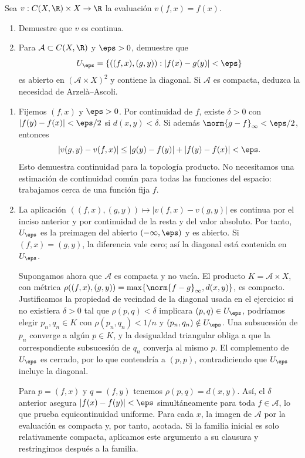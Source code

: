 \begin{ejercicio}\label{ej:lectura-27-2}
Sea $v:C(X,\R)\times X\to\R$ la evaluación $v(f,x)=f(x)$.
\begin{enumerate}[label=(\roman*)]
\item Demuestre que $v$ es continua.
\item Para $\mathcal A\subset C(X,\R)$ y $\eps>0$, demuestre que
\[
 U_\eps=\{((f,x),(g,y)):|f(x)-g(y)|<\eps\}
\]
es abierto en $(\mathcal A\times X)^2$ y contiene la diagonal. Si $\mathcal A$ es compacta, deduzca la necesidad de Arzelà--Ascoli.
\end{enumerate}
\end{ejercicio}
\begin{solucion}
\begin{enumerate}[label=(\roman*)]
\item Fijemos $(f,x)$ y $\eps>0$. Por continuidad de $f$, existe $\delta>0$ con $|f(y)-f(x)|<\eps/2$ si $d(x,y)<\delta$. Si además $\norm{g-f}_\infty<\eps/2$, entonces
\[
 |v(g,y)-v(f,x)|\le|g(y)-f(y)|+|f(y)-f(x)|<\eps.
\]
Esto demuestra continuidad para la topología producto. No necesitamos una estimación de continuidad común para todas las funciones del espacio: trabajamos cerca de una función fija $f$.
\item La aplicación $((f,x),(g,y))\mapsto|v(f,x)-v(g,y)|$ es continua por el inciso anterior y por continuidad de la resta y del valor absoluto. Por tanto, $U_\eps$ es la preimagen del abierto $(-\infty,\eps)$ y es abierto. Si $(f,x)=(g,y)$, la diferencia vale cero; así la diagonal está contenida en $U_\eps$.

Supongamos ahora que $\mathcal A$ es compacta y no vacía. El producto $K=\mathcal A\times X$, con métrica
$\rho((f,x),(g,y))=\max\{\norm{f-g}_\infty,d(x,y)\}$, es compacto. Justificamos la propiedad de vecindad de la diagonal usada en el ejercicio: si no existiera $\delta>0$ tal que $\rho(p,q)<\delta$ implicara $(p,q)\in U_\eps$, podríamos elegir $p_n,q_n\in K$ con $\rho(p_n,q_n)<1/n$ y $(p_n,q_n)\notin U_\eps$. Una subsucesión de $p_n$ converge a algún $p\in K$, y la desigualdad triangular obliga a que la correspondiente subsucesión de $q_n$ converja al mismo $p$. El complemento de $U_\eps$ es cerrado, por lo que contendría a $(p,p)$, contradiciendo que $U_\eps$ incluye la diagonal.

Para $p=(f,x)$ y $q=(f,y)$ tenemos $\rho(p,q)=d(x,y)$. Así, el $\delta$ anterior asegura $|f(x)-f(y)|<\eps$ simultáneamente para toda $f\in\mathcal A$, lo que prueba equicontinuidad uniforme. Para cada $x$, la imagen de $\mathcal A$ por la evaluación es compacta y, por tanto, acotada. Si la familia inicial es solo relativamente compacta, aplicamos este argumento a su clausura y restringimos después a la familia.
\end{enumerate}
\end{solucion}

